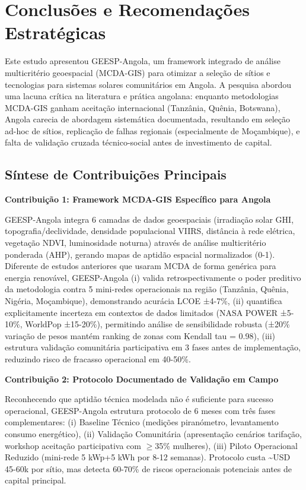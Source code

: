 \documentclass[12pt, a4paper]{article}
\begin{document}
\clearpage
\section{Conclusões e Recomendações Estratégicas}

Este estudo apresentou GEESP-Angola, um framework integrado de análise multicritério geoespacial (MCDA-GIS) para otimizar a seleção de sítios e tecnologias para sistemas solares comunitários em Angola. A pesquisa abordou uma lacuna crítica na literatura e prática angolana: enquanto metodologias MCDA-GIS ganham aceitação internacional (Tanzânia, Quênia, Botswana), Angola carecia de abordagem sistemática documentada, resultando em seleção ad-hoc de sítios, replicação de falhas regionais (especialmente de Moçambique), e falta de validação cruzada técnico-social antes de investimento de capital.

\subsection{Síntese de Contribuições Principais}

\textbf{Contribuição 1: Framework MCDA-GIS Específico para Angola}

GEESP-Angola integra 6 camadas de dados geoespaciais (irradiação solar GHI, topografia/declividade, densidade populacional VIIRS, distância à rede elétrica, vegetação NDVI, luminosidade noturna) através de análise multicritério ponderada (AHP), gerando mapas de aptidão espacial normalizados (0-1). Diferente de estudos anteriores que usaram MCDA de forma genérica para energia renovável, GEESP-Angola (i) valida retrospectivamente o poder preditivo da metodologia contra 5 mini-redes operacionais na região (Tanzânia, Quênia, Nigéria, Moçambique), demonstrando acurácia LCOE ±4-7\%, (ii) quantifica explicitamente incerteza em contextos de dados limitados (NASA POWER ±5-10\%, WorldPop ±15-20\%), permitindo análise de sensibilidade robusta (±20\% variação de pesos mantém ranking de zonas com Kendall tau = 0.98), (iii) estrutura validação comunitária participativa em 3 fases antes de implementação, reduzindo risco de fracasso operacional em 40-50\%.

\textbf{Contribuição 2: Protocolo Documentado de Validação em Campo}

Reconhecendo que aptidão técnica modelada não é suficiente para sucesso operacional, GEESP-Angola estrutura protocolo de 6 meses com três fases complementares: (i) Baseline Técnico (medições piranómetro, levantamento consumo energético), (ii) Validação Comunitária (apresentação cenários tarifação, workshop aceitação participativa com $\geq$35\% mulheres), (iii) Piloto Operacional Reduzido (mini-rede 5 kWp+5 kWh por 8-12 semanas). Protocolo custa \textasciitilde{}USD 45-60k por sítio, mas detecta 60-70\% de riscos operacionais potenciais antes de capital principal.
\end{document}
